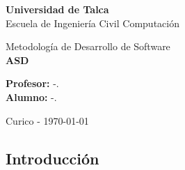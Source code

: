 \documentclass[12pt,letterpaper]{article}
\begin{document}
\setlength{\unitlength}{1 cm} %
\thispagestyle{empty}

\begin{flushleft}
\textbf{Universidad de Talca}\\
Escuela de Ingeniería Civil Computación\\[5.25cm]
\end{flushleft}

\begin{center}
{\Large Metodología de Desarrollo de Software}\\
{\LARGE \textbf{ASD}}\\[4.5cm]
\end{center}

\begin{flushright}
\textbf{Profesor: } -.\\
\textbf{Alumno: }-.\\[5.5cm]
\end{flushright}
\begin{center}
Curico - \today
\end{center}
\newpage
\tableofcontents
\newpage
\subsection*{Introducción}
\newpage
\end{document}

